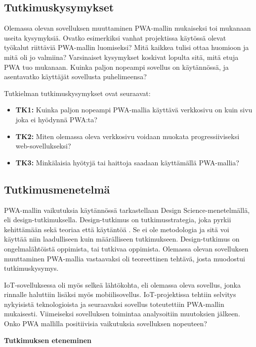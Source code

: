 \documentclass{tktltiki}
\begin{document}
\subsection{Tutkimuskysymykset}

Olemassa olevan sovelluksen muuttaminen PWA-mallin mukaiseksi toi mukanaan useita kysymyksiä. Ovatko esimerkiksi vanhat projektissa käytössä olevat työkalut riittäviä PWA-mallin luomiseksi? Mitä kaikkea tulisi ottaa huomioon ja mitä oli jo valmiina? Varsinaiset kysymykset koskivat lopulta sitä, mitä etuja PWA tuo mukanaan. Kuinka paljon nopeampi sovellus on käytännössä, ja asentavatko käyttäjät sovellusta puhelimeensa?

Tutkielman tutkimuskysymykset ovat seuraavat:

\begin{itemize}
  \item \textbf{TK1:} Kuinka paljon nopeampi PWA-mallia käyttävä verkkosivu on kuin sivu joka ei hyödynnä PWA:ta?
  \item \textbf{TK2:} Miten olemassa oleva verkkosivu voidaan muokata progressiiviseksi web-sovellukseksi?
  \item \textbf{TK3:} Minkälaisia hyötyjä tai haittoja saadaan käyttämällä PWA-mallia? 
\end{itemize}

\subsection{Tutkimusmenetelmä}

PWA-mallin vaikutuksia käytännössä tarkastellaan Design Science-menetelmällä, eli design-tutkimuksella. Design-tutkimus on tutkimusstrategia, joka pyrkii kehittämään sekä teoriaa että käytäntöä \cite{ponka}. Se ei ole metodologia ja sitä voi käyttää niin laadulliseen kuin määrälliseen tutkimukseen. Design-tutkimus on ongelmalähtöistä oppimista, tai tutkivaa oppimista. Olemassa olevan sovelluksen muuttaminen PWA-mallia vastaavaksi oli teoreettinen tehtävä, josta muodostui tutkimuskysymys. 

IoT-sovelluksessa oli myös selkeä lähtökohta, eli olemassa oleva sovellus, jonka rinnalle haluttiin lisäksi myös mobiilisovellus. IoT-projektissa tehtiin selvitys nykyisistä teknologioista ja seuraavaksi sovellus toteutettiin PWA-mallin mukaisesti. Viimeiseksi sovelluksen toimintaa analysoitiin muutoksien jälkeen. Onko PWA mallilla positiivisia vaikutuksia sovelluksen nopeuteen?

\textbf{Tutkimuksen eteneminen}
\end{document}
